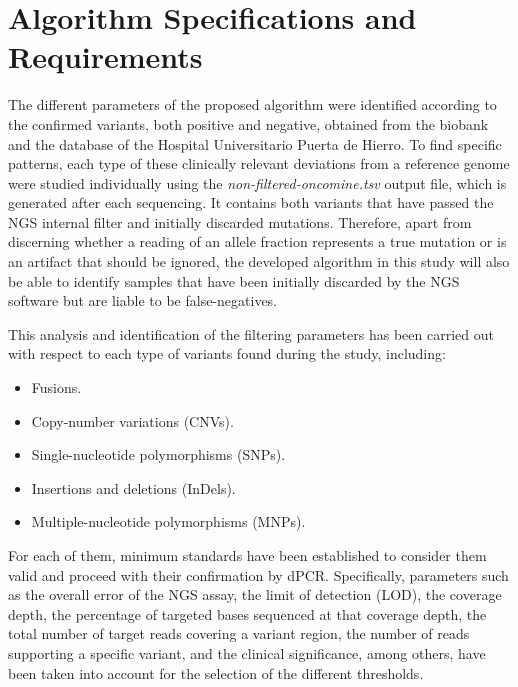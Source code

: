 \section{Algorithm Specifications and Requirements}





The different parameters of the proposed algorithm were identified according to the confirmed variants, both positive and negative, obtained from the biobank and the database of the Hospital Universitario Puerta de Hierro. To find specific patterns, each type of these clinically relevant deviations from a reference genome were studied individually using the \textit{non-filtered-oncomine.tsv} output file, which is generated after each sequencing. It contains both variants that have passed the NGS internal filter and initially discarded mutations. Therefore, apart from discerning whether a reading of an allele fraction represents a true mutation or is an artifact that should be ignored, the developed algorithm in this study will also be able to identify samples that have been initially discarded by the NGS software but are liable to be false-negatives.

This analysis and identification of the filtering parameters has been carried out with respect to each type of variants found during the study, including:
\begin{itemize}
    \item Fusions.
    \item Copy-number variations (CNVs).
    \item Single-nucleotide polymorphisms (SNPs).
    \item Insertions and deletions (InDels).
    \item Multiple-nucleotide polymorphisms (MNPs).
\end{itemize}

For each of them, minimum standards have been established to consider them valid and proceed with their confirmation by dPCR. Specifically, parameters such as the overall error of the NGS assay, the limit of detection (LOD), the coverage depth, the percentage of targeted bases sequenced at that coverage depth, the total number of target reads covering a variant region, the number of reads supporting a specific variant, and the clinical significance, among others, have been taken into account for the selection of the different thresholds.

